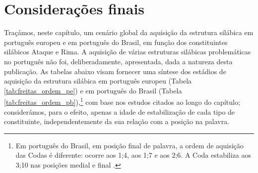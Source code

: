 \documentclass[output=paper]{LSP/langsci}
\begin{document}
\section{Considerações finais}
\label{sec:freitas_conclusao}

Traçámos, neste capítulo, um cenário global da aquisição da estrutura silábica em português europeu e em português do Brasil, em função dos constituintes silábicos Ataque e Rima. A aquisição de várias estruturas silábicas problemáticas no português não foi, deliberadamente, apresentada, dada a natureza desta publicação. As tabelas abaixo visam fornecer uma síntese dos estádios de aquisição da estrutura silábica em português europeu (Tabela \ref{tab:freitas_ordem_pe}) e em português do Brasil (Tabela \ref{tab:freitas_ordem_pb}),\footnote{Em português do Brasil, em posição final de palavra, a ordem de aquisição das Codas é diferente:  ocorre aos 1;4,  aos 1;7 e  aos 2;6. A Coda  estabiliza aos 3;10 nas posições medial e final \citep{lamprecht_etal2004}.} com base nos estudos citados ao longo do capítulo; considerámos, para o efeito, apenas a idade de estabilização de cada tipo de constituinte, independentemente da sua relação com a posição na palavra.

\begin{table}
  \caption{Ordem de estabilização dos constituintes silábicos no português europeu}
  \label{tab:freitas_ordem_pe}
\end{table}
\end{document}

